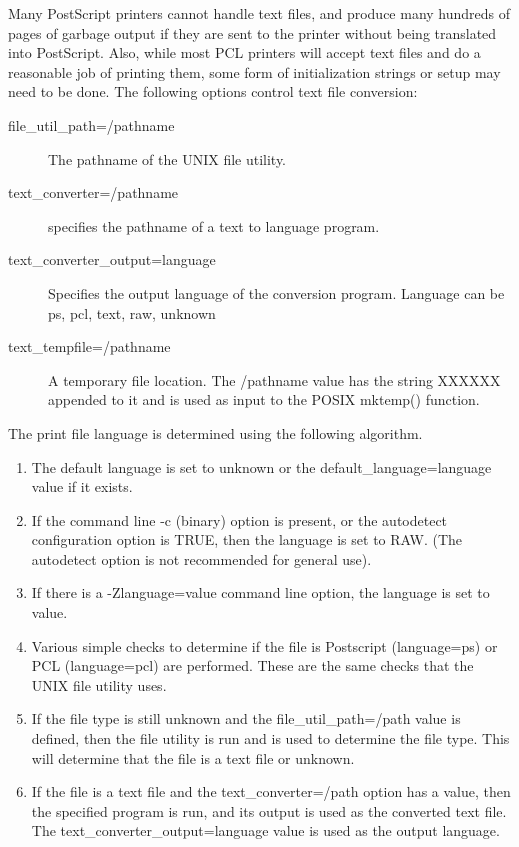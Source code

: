 \documentclass[a4paper]{article}
\begin{document}
Many PostScript printers cannot handle text files,
and produce many hundreds of pages of garbage
output if they are sent to the printer without being translated
into PostScript.
Also,
while most PCL printers will accept text files and do a reasonable
job of printing them,
some form of initialization strings or setup may need to be done.
The following options control text file
conversion:
\begin{description}
\item[{\ttfamily file\_util\_path=/pathname}] \mbox{}

The pathname of the UNIX file utility.

\item[{\ttfamily text\_converter=/pathname}] \mbox{}

specifies the pathname of a text to language program.

\item[{\ttfamily text\_converter\_output=language}] \mbox{}

Specifies the output language of the conversion program.
Language can be
{\ttfamily ps},
{\ttfamily pcl},
{\ttfamily text},
{\ttfamily raw},
{\ttfamily unknown}

\item[{\ttfamily text\_tempfile=/pathname}] \mbox{}

A temporary file location.
The
{\ttfamily /pathname}
value has the string
{\ttfamily XXXXXX}
appended to it and is used as input to the POSIX
{\ttfamily mktemp()}
function.

\end{description}


The print file language is determined using the following algorithm.
\begin{enumerate}
\item The default language is set to
{\ttfamily unknown}
or the
{\ttfamily default\_language=language} value if it exists.
\item If the command line
{\ttfamily -c}
(binary) option is present,
or the
{\ttfamily autodetect} configuration option is TRUE,
then the language is set to
{\ttfamily RAW}.
(The autodetect option is not recommended for general use).
\item If there is a
{\ttfamily -Zlanguage=value} command line option,
the language is set to
{\ttfamily value}.
\item Various simple checks to determine if the file is
Postscript
(language={\ttfamily ps})
or PCL
(language={\ttfamily pcl})
are performed.
These are the same checks that the UNIX
{\ttfamily file}
utility uses.
\item If the file type is still
{\ttfamily unknown}
and the
{\ttfamily file\_util\_path=/path}
value is defined, then the
{\ttfamily file}
utility is run and is used to determine the file type.
This will determine that the file is a
{\ttfamily text}
file
or
{\ttfamily unknown}.
\item If the file is a
{\ttfamily text}
file and the
{\ttfamily text\_converter=/path}
option has a value,
then the specified program is run,
and its output is used as the converted text file.
The 
{\ttfamily text\_converter\_output=language}
value is used as the output language.
\end{enumerate}
\end{document}
